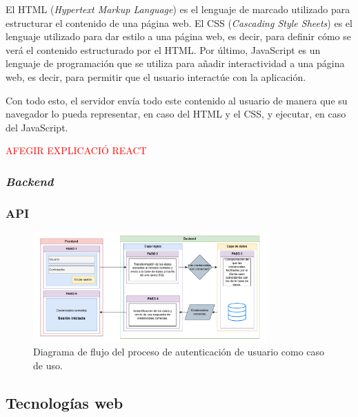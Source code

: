 El HTML (\textit{Hypertext Markup Language}) es el lenguaje de marcado utilizado para estructurar el contenido de una página web. El CSS (\textit{Cascading Style Sheets}) es el lenguaje utilizado para dar estilo a una página web, es decir, para definir cómo se verá el contenido estructurado por el HTML. Por último, JavaScript es un lenguaje de programación que se utiliza para añadir interactividad a una página web, es decir, para permitir que el usuario interactúe con la aplicación.

Con todo esto, el servidor envía todo este contenido al usuario de manera que su navegador lo pueda representar, en caso del HTML y el CSS, y ejecutar, en caso del JavaScript.

\textcolor{red}{AFEGIR EXPLICACIÓ REACT}

\subsubsection{\textit{Backend}}

\subsubsection{API}

\begin{figure}
    \centering
    \includegraphics[width=0.8\textwidth]{figures/theoric_frame/use_case.pdf}
    \caption{Diagrama de flujo del proceso de autenticación de usuario como caso de uso.}
    \label{fig:use_case}
\end{figure}

\subsection{Tecnologías web}
